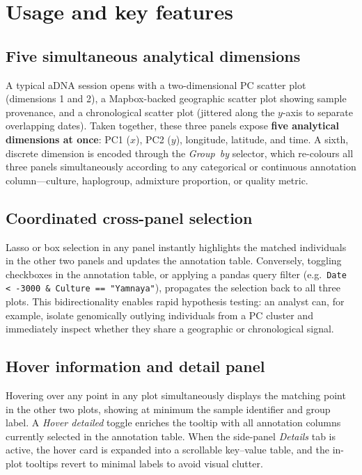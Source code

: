 \documentclass[unnumsec,webpdf,contemporary,large]{oup-authoring-template}
\begin{document}
\section{Usage and key features}

\subsection{Five simultaneous analytical dimensions}

A typical aDNA session opens with a two-dimensional PC scatter plot
(dimensions 1 and 2), a Mapbox-backed geographic scatter plot showing
sample provenance, and a chronological scatter plot (jittered along
the $y$-axis to separate overlapping dates).
Taken together, these three panels expose \textbf{five analytical
dimensions at once}: PC1 ($x$), PC2 ($y$), longitude, latitude, and
time.
A sixth, discrete dimension is encoded through the \textit{Group~by}
selector, which re-colours all three panels simultaneously according to
any categorical or continuous annotation column---culture, haplogroup,
admixture proportion, or quality metric.

\subsection{Coordinated cross-panel selection}

Lasso or box selection in any panel instantly highlights the matched
individuals in the other two panels and updates the annotation table.
Conversely, toggling checkboxes in the annotation table, or applying a
pandas query filter (e.g.\ \texttt{Date < -3000 \& Culture ==
"Yamnaya"}), propagates the selection back to all three plots.
This bidirectionality enables rapid hypothesis testing: an analyst can,
for example, isolate genomically outlying individuals from a PC cluster
and immediately inspect whether they share a geographic or
chronological signal.

\subsection{Hover information and detail panel}

Hovering over any point in any plot simultaneously displays the
matching point in the other two plots, showing at minimum the sample
identifier and group label.
A \textit{Hover detailed} toggle enriches the tooltip with all
annotation columns currently selected in the annotation table.
When the side-panel \textit{Details} tab is active, the hover card is
expanded into a scrollable key--value table, and the in-plot tooltips
revert to minimal labels to avoid visual clutter.
\end{document}
